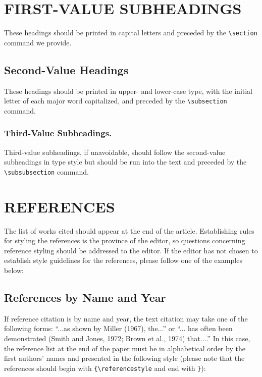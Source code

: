 \documentclass[12pt]{book}
\begin{document}
\section{FIRST-VALUE SUBHEADINGS}

These headings should be printed in capital letters and preceded by
the \verb$\section$ command we provide.

\subsection{Second-Value Headings}

These headings should be printed in upper- and lower-case type,
with the initial letter of each major word capitalized, and
preceded by the \verb$\subsection$ command.

\subsubsection{Third-Value Subheadings.} Third-value subheadings,
if unavoidable, should follow the second-value subheadings in type
style but should be run into the text and preceded by the
\verb$\subsubsection$ command.

\section{REFERENCES}

The list of works cited should appear at the end of the article.
Establishing rules for styling the references is the province of
the editor, so questions concerning reference styling should be
addressed to the editor. If the editor has not chosen to establish
style guidelines for the references, please follow one of the
examples below:

\subsection{References by Name and Year}

If reference citation is by name and year, the text citation may
take one of the following forms: ``...as shown by Miller (1967),
the...'' or ``... has often been demonstrated (Smith and Jones,
1972; Brown et al., 1974) that....'' In this case, the reference
list at the end of the paper must be in alphabetical order by the
first authors' names and presented in the following style (please
note that the references should begin with \verb${\referencestyle$
and end with \verb$}$):
\end{document}
